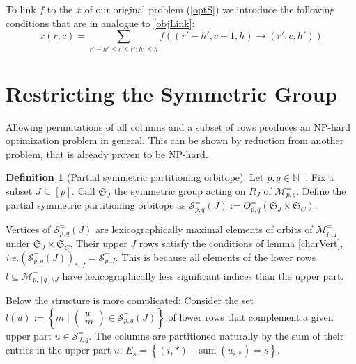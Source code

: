 \documentclass[a4paper]{amsart}
\theoremstyle{lemma}
\theoremstyle{definition}
\newtheorem{defn}[theorem]{Definition}
\theoremstyle{remark}
\def\ie{\emph{i.e.}}
\newcommand\mpar[1]{\marginpar {\flushleft\sffamily\small #1}}
\newcommand{\todo}[1]{\mpar{#1}}
\newcommand{\lr}[1]{\ensuremath{\left( #1 \right)}}
\newcommand{\lrE}[1]{\ensuremath{\left[ #1 \right]}}
\newcommand{\lrM}[1]{\ensuremath{\left\{ #1 \right\}}}
\newcommand{\naturals}{\ensuremath{\mathbb{N}}}
\newcommand{\M}{\ensuremath{\mathcal{M}}}
\newcommand{\calS}{\ensuremath{\mathcal{S}}}
\newcommand{\Sym}{\ensuremath{\mathfrak{S}}}
\begin{document}
To link \(f\) to the \(x\) of our original problem (\ref{optS}) we
introduce the following conditions that are in analogue to \ref{objLink}:
\begin{equation}
  x \lr{ r, c }=
  \sum_{r' - h' \leq r \leq r'; h' \leq h} f\lr{\lr{r'-h', c-1, h}
    \rightarrow \lr{r', c, h'} }
\end{equation}

\section{Restricting the Symmetric Group}

Allowing permutations of all columns and a subset of rows produces an
NP-hard optimization problem in general.  This can be shown by
reduction from another problem, that is already proven to be NP-hard.

\begin{defn}[Partial symmetric partitioning orbitope]
  \label{def-subset-rows}
  Let \(p, q \in \naturals^+\).  Fix a subset \(J \subseteq \lrE{p}\).
  Call \(\Sym_{J}\) the symmetric group acting on \(R_J\) of
  \(\M^=_{p, q}\).  Define the partial symmetric partitioning orbitope
  as \(\mathcal{S}^=_{p,q}\lr{J} := O^=_{p, q} \lr{\Sym_{J} \times
    \Sym_{C}} \).
\end{defn}

Vertices of \(\calS^=_{p,q}\lr{J}\) are lexicographically maximal elements of orbits of \(\M^=_{p,q}\) under \(\Sym_{J} \times
    \Sym_{C}\).  Their upper \(J\) rows satisfy the conditions of lemma
\ref{charVert}, \ie \(\lr{\calS^=_{p,q} \lr{J} }_{*,J} = \calS^=_{p,J}\).  This is because all elements of the lower
rows \(l \subseteq \M^=_{p,  \lrE{q}\setminus J}\) have lexicographically less significant
indices than the upper part.

Below the structure is more complicated: Consider the set \(l\lr{u} :=\lrM{ m  \mid  \lr{\begin{matrix}u\\m\end{matrix}} \in \calS^=_{p,q}\lr{J}}\)
of lower rows that complement a given upper part \(u\in\calS^=_{J,q}\).
The columns are partitioned naturally by the sum of their entries in the upper part \(u\): \(E_s = \lrM{\lr{i,*} \mid \mathop{sum} \lr{u_{i,*}} = s}\).

\todo{Weitermachen!  \(\sym{E_s} \dots\)}

\end{document}
